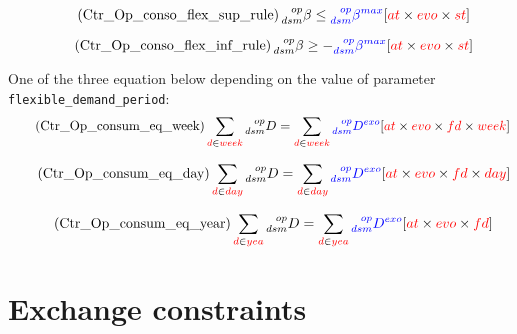 \documentclass[a4paper,11pt]{article}
\begin{document}
\begin{equation} \tag{Ctr\_Op\_conso\_flex\_sup\_rule}
\prescript{op}{dsm}{\beta} \leq  \textcolor{blue}{\prescript{op}{dsm}{\beta^{max}}} \hfill [\textcolor{red}{at} \times \textcolor{red}{evo} \times \textcolor{red}{st}]
\label{eq:Ctr_Op_conso_flex_sup_rule}
\end{equation}

\begin{equation} \tag{Ctr\_Op\_conso\_flex\_inf\_rule}
\prescript{op}{dsm}{\beta} \geq - \textcolor{blue}{\prescript{op}{dsm}{\beta^{max}}} \hfill [\textcolor{red}{at} \times \textcolor{red}{evo} \times \textcolor{red}{st}]
\label{eq:Ctr_Op_conso_flex_inf_rule}
\end{equation}

One of the three equation below depending on the value of parameter  \verb|flexible_demand_period|: 
\begin{equation} \tag{Ctr\_Op\_consum\_eq\_week}
 \sum_{\textcolor{red}{d} \in \textcolor{red}{week}} \prescript{op}{dsm}{D} = \sum_{\textcolor{red}{d} \in \textcolor{red}{week}} \textcolor{blue}{\prescript{op}{dsm}{D^{exo}}}  \hfill [\textcolor{red}{at} \times \textcolor{red}{evo} \times \textcolor{red}{fd} \times \textcolor{red}{week}]
\label{eq:Ctr_Op_consum_eq_week}
\end{equation}

\begin{equation} \tag{Ctr\_Op\_consum\_eq\_day}
 \sum_{\textcolor{red}{d} \in \textcolor{red}{day}} \prescript{op}{dsm}{D} = \sum_{\textcolor{red}{d} \in \textcolor{red}{day}} \textcolor{blue}{\prescript{op}{dsm}{D^{exo}}}  \hfill [\textcolor{red}{at} \times \textcolor{red}{evo} \times \textcolor{red}{fd} \times \textcolor{red}{day}]
\label{eq:Ctr_Op_consum_eq_day}
\end{equation}

\begin{equation} \tag{Ctr\_Op\_consum\_eq\_year}
 \sum_{\textcolor{red}{d} \in \textcolor{red}{yea}} \prescript{op}{dsm}{D} = \sum_{\textcolor{red}{d} \in \textcolor{red}{yea}} \textcolor{blue}{\prescript{op}{dsm}{D^{exo}}}  \hfill [\textcolor{red}{at} \times \textcolor{red}{evo} \times \textcolor{red}{fd} ]
\label{eq:Ctr_Op_consum_eq_year}
\end{equation}

\newpage
\section{Exchange constraints}
\end{document}
